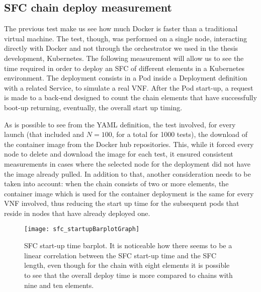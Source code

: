 

\subsection{SFC chain deploy measurement}

The previous test make us see how much Docker is faster than a traditional
virtual machine. The test, though, was performed on a single node, interacting
directly with Docker and not through the orchestrator we used in the thesis
development, Kubernetes. The following measurement will allow us to see the time
required in order to deploy an SFC of different elements in a Kubernetes
environment. The deployment consists in a Pod inside a Deployment definition
with a related Service, to simulate a real VNF. After the Pod start-up, a 
request
is made to a back-end designed to count the chain elements that have 
successfully
boot-up returning, eventually, the overall start up timing.



\vspace{0.5cm}

\noindent As is possible to see from the YAML definition, the test involved, for
every launch (that included and $N = 100$, for a total for 1000 tests), the 
download of the container image from the Docker hub repositories. This, while 
it forced every node to delete and download the image for each test, it ensured 
consistent measurements in cases where the selected node for the deployment did 
not have the image already pulled. In addition to that, another consideration 
needs to be taken into account: when the chain consists of two or more 
elements, the container image which is used for the container deployment is the 
same for every VNF involved, thus reducing the start up time for the subsequent 
pods that reside in nodes that have already deployed one.

\begin{figure}[t]
  \centering
  \texttt{[image: sfc\_startupBarplotGraph]}
  \caption[SFC start-up time barplot]{SFC start-up time barplot. It is
    noticeable how there seems to be a linear correlation between the SFC
    start-up time and the SFC length, even though for the chain with eight
    elements it is possible to see that the overall deploy time is more compared
    to chains with nine and ten elements.}
  \label{chap:tests:sec:sfclength:img:barplot}
\end{figure}

